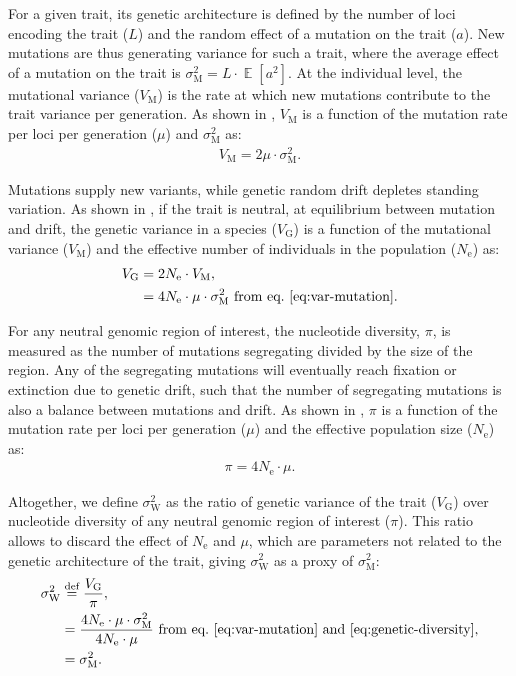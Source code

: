 \documentclass{article}
\newcommand{\defEqual}{\stackrel{\text{def}}{=}}
\newcommand{\Multiply}{\cdot}
\DeclareMathOperator{\E}{\mathbb{E}}
\newcommand{\Ne}{N_{\text{e}}}
\newcommand{\MutationRate}{\mu}
\newcommand{\NbrLoci}{L}
\newcommand{\VarGenetic}{V_{\mathrm{G}}}
\newcommand{\VarMutation}{V_{\mathrm{M}}}
\newcommand{\RateMut}{\sigma^2_{\mathrm{M}}}
\newcommand{\RateWhithin}{\sigma^2_{\mathrm{W}}}
\begin{document}
For a given trait, its genetic architecture is defined by the number of loci encoding the trait ($\NbrLoci$) and the random effect of a mutation on the trait ($a$).
New mutations are thus generating variance for such a trait, where the average effect of a mutation on the trait is $\RateMut = \NbrLoci \Multiply  \E [a^2]$.
At the individual level, the mutational variance ($\VarMutation$) is the rate at which new mutations contribute to the trait variance per generation.
As shown in \textcite{lande_quantitative_1979, lande_sexual_1980}, $\VarMutation$ is a function of the mutation rate per loci per generation ($\MutationRate$) and $\RateMut$ as:
\begin{gather}
    \VarMutation = 2 \MutationRate \Multiply \RateMut \label{eq:var-mutation}.
\end{gather}

Mutations supply new variants, while genetic random drift depletes standing variation.
As shown in \textcite{lynch_mutation_1998}, if the trait is neutral, at equilibrium between mutation and drift, the genetic variance in a species ($\VarGenetic$) is a function of the mutational variance ($\VarMutation$) and the effective number of individuals in the population ($\Ne$) as:
\begin{align}
    \VarGenetic & =  2 \Ne \Multiply \VarMutation, \\
    & = 4 \Ne \Multiply \MutationRate \Multiply \RateMut \text{ from eq.~\ref{eq:var-mutation}}\label{eq:var-genetic}.
\end{align}

For any neutral genomic region of interest, the nucleotide diversity, $\pi$, is measured as the number of mutations segregating divided by the size of the region.
Any of the segregating mutations will eventually reach fixation or extinction due to genetic drift, such that the number of segregating mutations is also a balance between mutations and drift.
As shown in \textcite{tajima_statistical_1989}, $\pi$ is a function of the mutation rate per loci per generation ($\MutationRate$) and the effective population size ($\Ne$) as:
\begin{gather}
    \pi = 4 \Ne \Multiply \MutationRate \label{eq:genetic-diversity}.
\end{gather}

Altogether, we define $\RateWhithin$ as the ratio of genetic variance of the trait ($\VarGenetic$) over nucleotide diversity of any neutral genomic region of interest ($\pi$).
This ratio allows to discard the effect of $\Ne$ and $\MutationRate$, which are parameters not related to the genetic architecture of the trait, giving $\RateWhithin$ as a proxy of $\RateMut$:
\begin{align}
    \RateWhithin & \defEqual \frac{\VarGenetic }{\pi}, \\
    & = \frac{4 \Ne \Multiply \MutationRate \Multiply \RateMut}{4 \Ne \Multiply \MutationRate} \text{ from eq.~\ref{eq:var-mutation} and~\ref{eq:genetic-diversity}}, \\
    & = \RateMut. \label{eq:rate-pop}
\end{align}
\end{document}
